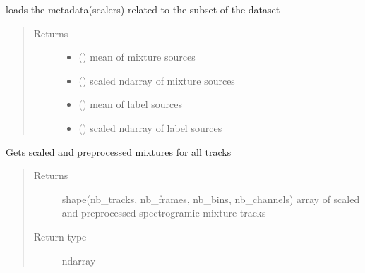 \documentclass[letterpaper,10pt,english]{sphinxmanual}
\begin{document}
\begin{fulllineitems}
\begin{fulllineitems}
\end{fulllineitems}


\begin{fulllineitems}
\label{\detokenize{docs/source/dataset:dataset.Dataset.load_metadata}}
loads the metadata(scalers) related to the subset of the dataset
\begin{quote}\begin{description}
\item[{Returns}] \leavevmode
\begin{itemize}
\item {} 
 () \textendash{} mean of mixture sources

\item {} 
 () \textendash{} scaled ndarray of mixture sources

\item {} 
 () \textendash{} mean of label sources

\item {} 
 () \textendash{} scaled ndarray of label sources

\end{itemize}


\end{description}\end{quote}

\end{fulllineitems}


\begin{fulllineitems}
\label{\detokenize{docs/source/dataset:dataset.Dataset.mixtures}}
Gets scaled and preprocessed mixtures for all tracks
\begin{quote}\begin{description}
\item[{Returns}] \leavevmode
{} \textendash{} shape(nb\_tracks, nb\_frames, nb\_bins, nb\_channels)
array of scaled and preprocessed spectrogramic mixture tracks

\item[{Return type}] \leavevmode
ndarray

\end{description}\end{quote}

\end{fulllineitems}


\end{fulllineitems}
\end{document}
